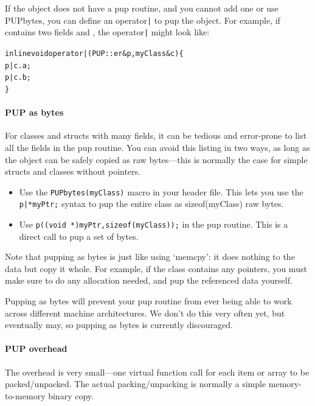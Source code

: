 If the object does not have a pup routine, and you cannot add one or use 
PUPbytes, you can define an operator\verb.|. to pup the object.
For example, if  contains two fields  and , the 
operator\verb.|. might look like:

\begin{alltt}
  inline void operator|(PUP::er &p,myClass &c) \{
    p|c.a;
    p|c.b;
  \}
\end{alltt}


\paragraph{PUP as bytes}
\label{sec:pupbytes}

For classes and structs with many fields, it can be tedious and 
error-prone to list all the fields in the pup routine.
You can avoid this listing in two ways, as long as the
object can be safely copied as raw bytes---this is normally 
the case for simple structs and classes without pointers.

\begin{itemize}
\item Use the \verb.PUPbytes(myClass). macro in your header file.
      This lets you use the \verb.p|*myPtr;. syntax 
      to pup the entire class as sizeof(myClass) raw bytes.

\item Use \verb.p((void *)myPtr,sizeof(myClass));. in the pup 
      routine.  This is a direct call to pup a set of bytes.
\end{itemize}

Note that pupping as bytes is just like using `memcpy': 
it does nothing to the data but copy it whole.
For example, if the class contains any pointers, you
must make sure to do any allocation needed, and
pup the referenced data yourself.

Pupping as bytes will prevent your pup routine from 
ever being able to work across different machine 
architectures.  We don't do this very often yet, but 
eventually may, so pupping as bytes is currently discouraged.



\paragraph{PUP overhead}
\label{sec:pupoverhead}

The  overhead is very small---one virtual function call
for each item or array to be packed/unpacked.  The actual packing/unpacking is
normally a simple memory-to-memory binary copy. 

